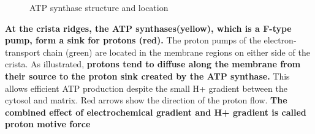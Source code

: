 \documentclass[../main.tex]{subfiles}
\begin{document}
\begin{figure}[H]
	\centering
	\caption{ATP synthase structure and location}
\end{figure}
\textbf{At the crista ridges, the ATP synthases(yellow), which is a F-type pump, form 
a sink for protons (red).} The proton pumps 
of the electron-transport chain (green) are 
located in the membrane regions on either 
side of the crista. As illustrated, \textbf{protons 
tend to diffuse along the membrane from 
their source to the proton sink created by 
the ATP synthase.} This allows efficient ATP 
production despite the small H+ gradient 
between the cytosol and matrix. Red arrows 
show the direction of the proton flow. \textbf{The combined effect of electrochemical gradient and H+ gradient is called proton motive force}
\end{document}
